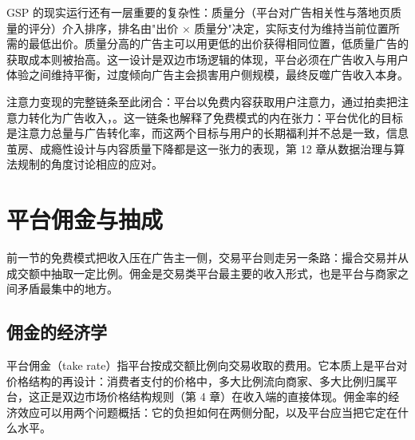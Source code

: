 GSP 的现实运行还有一层重要的复杂性：质量分（平台对广告相关性与落地页质量的评分）介入排序，排名由"出价 × 质量分"决定，实际支付为维持当前位置所需的最低出价。质量分高的广告主可以用更低的出价获得相同位置，低质量广告的获取成本则被抬高。这一设计是双边市场逻辑的体现，平台必须在广告收入与用户体验之间维持平衡，过度倾向广告主会损害用户侧规模，最终反噬广告收入本身。

注意力变现的完整链条至此闭合：平台以免费内容获取用户注意力，通过拍卖把注意力转化为广告收入，。这一链条也解释了免费模式的内在张力：平台优化的目标是注意力总量与广告转化率，而这两个目标与用户的长期福利并不总是一致，信息茧房、成瘾性设计与内容质量下降都是这一张力的表现，第 12 章从数据治理与算法规制的角度讨论相应的应对。

\section{平台佣金与抽成}

前一节的免费模式把收入压在广告主一侧，交易平台则走另一条路：撮合交易并从成交额中抽取一定比例。佣金是交易类平台最主要的收入形式，也是平台与商家之间矛盾最集中的地方。

\subsection{佣金的经济学}

平台佣金（take rate）指平台按成交额比例向交易收取的费用。它本质上是平台对价格结构的再设计：消费者支付的价格中，多大比例流向商家、多大比例归属平台，这正是双边市场价格结构规则（第 4 章）在收入端的直接体现。佣金率的经济效应可以用两个问题概括：它的负担如何在两侧分配，以及平台应当把它定在什么水平。

